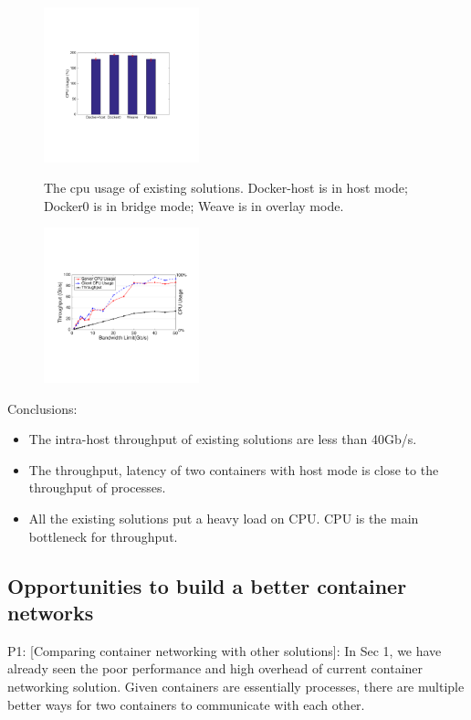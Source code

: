 \begin{figure}[ht]
     \centering 
     \includegraphics[width=0.4\textwidth]{figures/motivation/eval_exist_cpu.pdf} 
     \label{fig:eval_exist_cpu}
     \caption{The cpu usage of existing solutions. Docker-host is in host mode; Docker0 is in bridge mode; Weave is in overlay mode.} 
\end{figure} 

\begin{figure}[ht]
     \centering 
     \includegraphics[width=0.4\textwidth]{figures/motivation/eval_bw_cpu.pdf}      
     \label{fig:eval_bw_cpu}
     \caption{} 
\end{figure}

Conclusions:
\begin{itemize}
  \item The intra-host throughput of existing solutions are less than 40Gb/s.
  \item The throughput, latency of two containers with host mode is close to the throughput of processes.
  \item All the existing solutions put a heavy load on CPU. CPU is the main bottleneck for throughput.
\end{itemize}

\subsection{Opportunities to build a better container networks}
P1: [Comparing container networking with other solutions]: In Sec 1, we have already seen the poor performance and high overhead of current container networking solution. Given containers are essentially processes, there are multiple better ways for two containers to communicate with each other.


